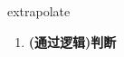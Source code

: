 
\begin{frame}
{\huge extrapolate}
\begin{center}
\begin{enumerate}\Large
  \item \textbf{(通过逻辑)判断}
\end{enumerate}
\end{center}
\end{frame}
